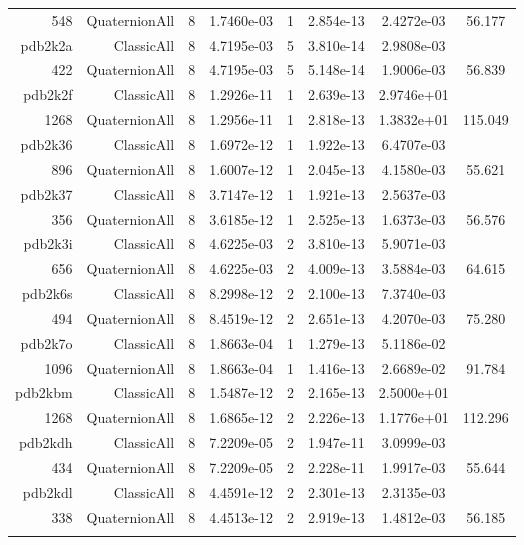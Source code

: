 \begin{xltabular}{\textwidth}{r|rcS[table-format=1.4e+2]cS[table-format=1.3e+2]S[table-format=1.4e+2]S[table-format=-1.3]}
548 & QuaternionAll & 8 & 1.7460e-03 & 1 & 2.854e-13 & 2.4272e-03 & 56.177\\  \addlinespace
pdb2k2a & ClassicAll & 8 & 4.7195e-03 & 5 & 3.810e-14 & 2.9808e-03 & \\
422 & QuaternionAll & 8 & 4.7195e-03 & 5 & 5.148e-14 & 1.9006e-03 & 56.839\\  \addlinespace
pdb2k2f & ClassicAll & 8 & 1.2926e-11 & 1 & 2.639e-13 & 2.9746e+01 & \\
1268 & QuaternionAll & 8 & 1.2956e-11 & 1 & 2.818e-13 & 1.3832e+01 & 115.049\\  \addlinespace
pdb2k36 & ClassicAll & 8 & 1.6972e-12 & 1 & 1.922e-13 & 6.4707e-03 & \\
896 & QuaternionAll & 8 & 1.6007e-12 & 1 & 2.045e-13 & 4.1580e-03 & 55.621\\  \addlinespace
pdb2k37 & ClassicAll & 8 & 3.7147e-12 & 1 & 1.921e-13 & 2.5637e-03 & \\
356 & QuaternionAll & 8 & 3.6185e-12 & 1 & 2.525e-13 & 1.6373e-03 & 56.576\\  \addlinespace
pdb2k3i & ClassicAll & 8 & 4.6225e-03 & 2 & 3.810e-13 & 5.9071e-03 & \\
656 & QuaternionAll & 8 & 4.6225e-03 & 2 & 4.009e-13 & 3.5884e-03 & 64.615\\  \addlinespace
pdb2k6s & ClassicAll & 8 & 8.2998e-12 & 2 & 2.100e-13 & 7.3740e-03 & \\
494 & QuaternionAll & 8 & 8.4519e-12 & 2 & 2.651e-13 & 4.2070e-03 & 75.280\\  \addlinespace
pdb2k7o & ClassicAll & 8 & 1.8663e-04 & 1 & 1.279e-13 & 5.1186e-02 & \\
1096 & QuaternionAll & 8 & 1.8663e-04 & 1 & 1.416e-13 & 2.6689e-02 & 91.784\\  \addlinespace
pdb2kbm & ClassicAll & 8 & 1.5487e-12 & 2 & 2.165e-13 & 2.5000e+01 & \\
1268 & QuaternionAll & 8 & 1.6865e-12 & 2 & 2.226e-13 & 1.1776e+01 & 112.296\\  \addlinespace
pdb2kdh & ClassicAll & 8 & 7.2209e-05 & 2 & 1.947e-11 & 3.0999e-03 & \\
434 & QuaternionAll & 8 & 7.2209e-05 & 2 & 2.228e-11 & 1.9917e-03 & 55.644\\  \addlinespace
pdb2kdl & ClassicAll & 8 & 4.4591e-12 & 2 & 2.301e-13 & 2.3135e-03 & \\
338 & QuaternionAll & 8 & 4.4513e-12 & 2 & 2.919e-13 & 1.4812e-03 & 56.185\\  \addlinespace

\end{xltabular}
